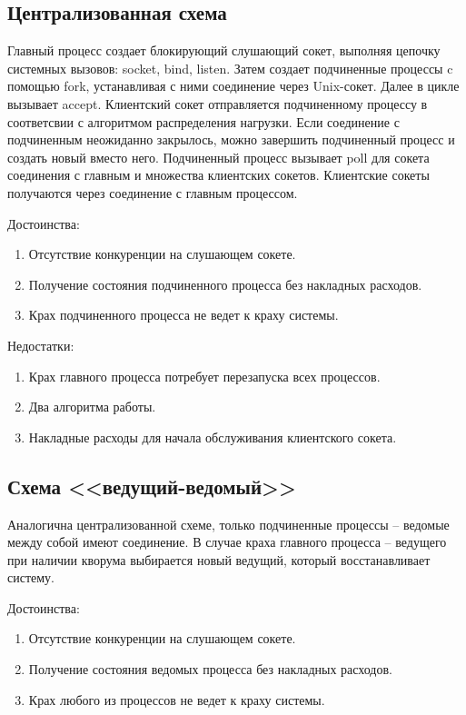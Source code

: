 \subsection{Централизованная схема}

Главный процесс создает блокирующий слушающий сокет, выполняя цепочку системных вызовов: socket, bind, listen.
Затем создает подчиненные процессы c помощью fork, устанавливая с ними соединение через Unix-сокет.
Далее в цикле вызывает accept.
Клиентский сокет отправляется подчиненному процессу в соответсвии с алгоритмом распределения нагрузки.
Если соединение с подчиненным неожиданно закрылось, можно завершить подчиненный процесс и создать новый вместо него.
Подчиненный процесс вызывает poll для сокета соединения с главным и множества клиентских сокетов.
Клиентские сокеты получаются через соединение с главным процессом.

Достоинства:
\begin{enumerate}
\item Отсутствие конкуренции на слушающем сокете.
\item Получение состояния подчиненного процесса без накладных расходов.
\item Крах подчиненного процесса не ведет к краху системы.
\end{enumerate}

Недостатки:
\begin{enumerate}
\item Крах главного процесса потребует перезапуска всех процессов.
\item Два алгоритма работы.
\item Накладные расходы для начала обслуживания клиентского сокета.
\end{enumerate}

\subsection{Схема <<ведущий-ведомый>>}

Аналогична централизованной схеме, только подчиненные процессы -- ведомые между собой имеют соединение.
В случае краха главного процесса -- ведущего при наличии кворума выбирается новый ведущий, который восстанавливает систему.

Достоинства:
\begin{enumerate}
\item Отсутствие конкуренции на слушающем сокете.
\item Получение состояния ведомых процесса без накладных расходов.
\item Крах любого из процессов не ведет к краху системы.
\end{enumerate}

